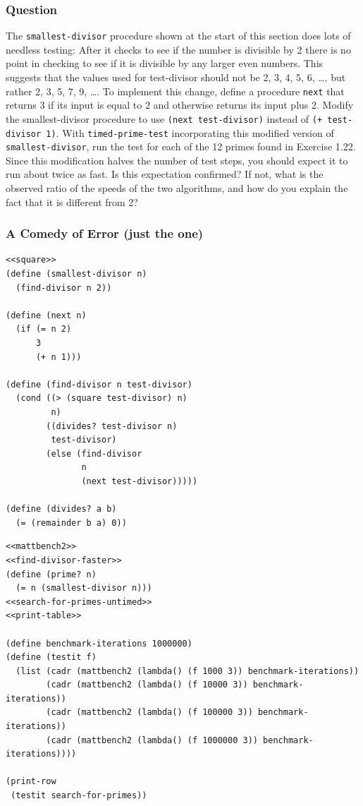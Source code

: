 \documentclass[final,fleqn,titlepage,twoside]{article}
\begin{document}
\subsubsection{Question}
\label{sec:orgcd3e0cf}
The \texttt{smallest-divisor} procedure shown at the start of this section
does lots of needless testing: After it checks to see if the number is divisible
by 2 there is no point in checking to see if it is divisible by any larger even
numbers. This suggests that the values used for test-divisor should not be 2, 3,
4, 5, 6, \dots{}, but rather 2, 3, 5, 7, 9, \dots{}. To implement this change,
define a procedure \texttt{next} that returns 3 if its input is equal to 2
and otherwise returns its input plus 2. Modify the smallest-divisor procedure to
use \texttt{(next test-divisor)} instead of \texttt{(+ test-divisor 1)}.
With \texttt{timed-prime-test} incorporating this modified version of
\texttt{smallest-divisor}, run the test for each of the 12 primes found in
Exercise 1.22. Since this modification halves the number of test steps, you
should expect it to run about twice as fast. Is this expectation confirmed? If
not, what is the observed ratio of the speeds of the two algorithms, and how do
you explain the fact that it is different from 2?

\subsubsection{A Comedy of Error (just the one)}
\label{sec:org9c00b7e}
\begin{verbatim}
<<square>>
(define (smallest-divisor n)
  (find-divisor n 2))

(define (next n)
  (if (= n 2)
      3
      (+ n 1)))

(define (find-divisor n test-divisor)
  (cond ((> (square test-divisor) n) 
         n)
        ((divides? test-divisor n) 
         test-divisor)
        (else (find-divisor 
               n 
               (next test-divisor)))))

(define (divides? a b)
  (= (remainder b a) 0))
\end{verbatim}
\begin{verbatim}
<<mattbench2>>
<<find-divisor-faster>>
(define (prime? n)
  (= n (smallest-divisor n)))
<<search-for-primes-untimed>>
<<print-table>>

(define benchmark-iterations 1000000)
(define (testit f)
  (list (cadr (mattbench2 (lambda() (f 1000 3)) benchmark-iterations))
        (cadr (mattbench2 (lambda() (f 10000 3)) benchmark-iterations))
        (cadr (mattbench2 (lambda() (f 100000 3)) benchmark-iterations))
        (cadr (mattbench2 (lambda() (f 1000000 3)) benchmark-iterations))))

(print-row
 (testit search-for-primes))
\end{verbatim}
\end{document}
